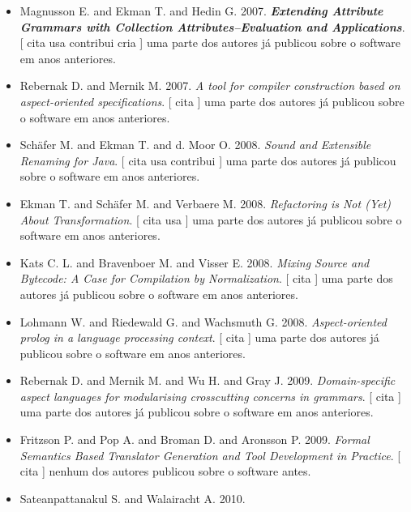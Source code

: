 \begin{itemize}
      [
          cita
          usa
      ]
uma parte dos autores já publicou sobre o software em anos anteriores.
\item Magnusson E. and Ekman T. and Hedin G.
      2007.
        \textbf{\textit{ Extending Attribute Grammars with Collection Attributes--Evaluation and Applications}}.
      [
          cita
          usa
          contribui
          cria
      ]
uma parte dos autores já publicou sobre o software em anos anteriores.
\item Rebernak D. and Mernik M.
      2007.
        \textit{ A tool for compiler construction based on aspect-oriented specifications}.
      [
          cita
      ]
uma parte dos autores já publicou sobre o software em anos anteriores.
\item Sch\"{a}fer M. and Ekman T. and d. Moor O.
      2008.
        \textit{ Sound and Extensible Renaming for Java}.
      [
          cita
          usa
          contribui
      ]
uma parte dos autores já publicou sobre o software em anos anteriores.
\item Ekman T. and Sch\"{a}fer M. and Verbaere M.
      2008.
        \textit{ Refactoring is Not (Yet) About Transformation}.
      [
          cita
          usa
      ]
uma parte dos autores já publicou sobre o software em anos anteriores.
\item Kats C. L. and Bravenboer M. and Visser E.
      2008.
        \textit{ Mixing Source and Bytecode: A Case for Compilation by Normalization}.
      [
          cita
      ]
uma parte dos autores já publicou sobre o software em anos anteriores.
\item Lohmann W. and Riedewald G. and Wachsmuth G.
      2008.
        \textit{ Aspect-oriented prolog in a language processing context}.
      [
          cita
      ]
uma parte dos autores já publicou sobre o software em anos anteriores.
\item Rebernak D. and Mernik M. and Wu H. and Gray J.
      2009.
        \textit{ Domain-specific aspect languages for modularising crosscutting concerns in grammars}.
      [
          cita
      ]
uma parte dos autores já publicou sobre o software em anos anteriores.
\item Fritzson P. and Pop A. and Broman D. and Aronsson P.
      2009.
        \textit{ Formal Semantics Based Translator Generation and Tool Development in Practice}.
      [
          cita
      ]
nenhum dos autores publicou sobre o software antes.
\item Sateanpattanakul S. and Walairacht A.
      2010.

\end{itemize}
